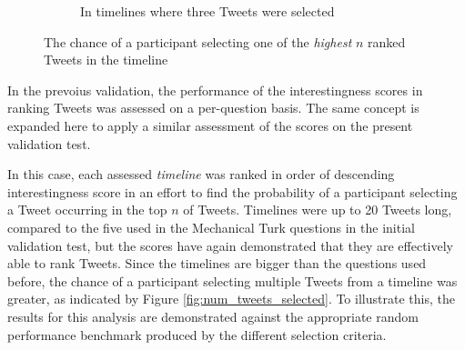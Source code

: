 \begin{figure}[h]
\begin{subfigure}{.5\textwidth}
    \centering
    \caption{In timelines where three Tweets were selected}
    \label{fig:rank-three}
\end{subfigure}
\caption{The chance of a participant selecting one of the \textit{highest} $n$ ranked Tweets in the timeline}
\end{figure}

In the prevoius validation, the performance of the interestingness scores in ranking Tweets was assessed on a per-question basis. The same concept is expanded here to apply a similar assessment of the scores on the present validation test.

In this case, each assessed \textit{timeline} was ranked in order of descending interestingness score in an effort to find the probability of a participant selecting a Tweet occurring in the top $n$ of Tweets. Timelines were up to 20 Tweets long, compared to the five used in the Mechanical Turk questions in the initial validation test, but the scores have again demonstrated that they are effectively able to rank Tweets. Since the timelines are bigger than the questions used before, the chance of a participant selecting multiple Tweets from a timeline was greater, as indicated by Figure \ref{fig:num_tweets_selected}. To illustrate this, the results for this analysis are demonstrated against the appropriate random performance benchmark produced by the different selection criteria.

